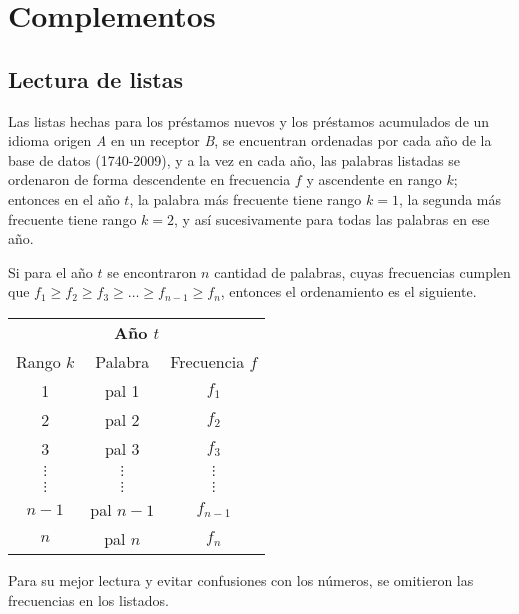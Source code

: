 \chapter{Complementos}

\section{Lectura de listas}
\label{lectura.listas}
 
Las listas hechas para los préstamos nuevos \cite{prestamos_nuevos} y los préstamos acumulados \cite{prestamos_acumulados} de un idioma origen \textit{A} en un receptor \textit{B},  se encuentran ordenadas por cada año de la base de datos (1740-2009), y a la vez en cada año, las palabras listadas se ordenaron de forma descendente en frecuencia $f$ y ascendente en rango $k$; entonces en el año $t$, la palabra más frecuente tiene rango $k=1$, la segunda más frecuente  tiene rango $k=2$, y así sucesivamente para todas las palabras en ese año. 

Si para el año $t$  se encontraron $n$ cantidad de palabras, cuyas frecuencias cumplen que $f_{1} \geq f_{2} \geq  f_{3} \geq   \dots \geq  f_{n-1} \geq  f_{n}$,  entonces el ordenamiento es el siguiente. 
\begin{table*}[htb]
	\centering
	\begin{tabular}{ccc}
		\multicolumn{3}{c}{\textbf{Año $t$}}          \\
		Rango $k$     & Palabra    & Frecuencia $f$    \\
		1             & pal 1      & $f_{1}$            \\
		2             & pal 2      & $f_{2}$             \\
		3             & pal 3      & $f_{3}$              \\
		$\vdots$      & $\vdots$   & $\vdots$         \\
		$\vdots$      & $\vdots$   & $\vdots$         \\
		$n-1$         & pal $n-1$  & $f_{n-1}$             \\
		$n$           & pal $n$    & $f_{n}$          
	\end{tabular}
\end{table*}


Para su mejor lectura y evitar confusiones con los números,  se omitieron las frecuencias en los listados. 








